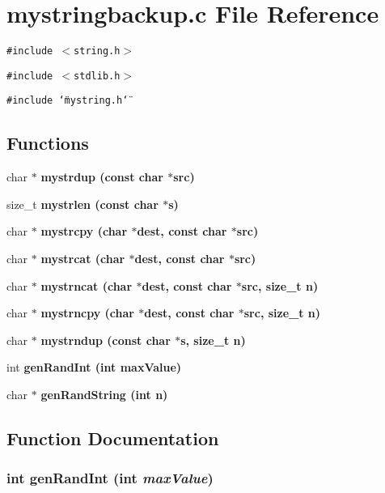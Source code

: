 \section{mystringbackup.c File Reference}
\label{mystringbackup_8c}
{\tt \#include $<$string.h$>$}\par
{\tt \#include $<$stdlib.h$>$}\par
{\tt \#include \char`\"{}mystring.h\char`\"{}}\par
\subsection*{Functions}
\begin{CompactItemize}
\item 
char $\ast$ \bf{mystrdup} (const char $\ast$src)
\item 
size\_\-t \bf{mystrlen} (const char $\ast$s)
\item 
char $\ast$ \bf{mystrcpy} (char $\ast$dest, const char $\ast$src)
\item 
char $\ast$ \bf{mystrcat} (char $\ast$dest, const char $\ast$src)
\item 
char $\ast$ \bf{mystrncat} (char $\ast$dest, const char $\ast$src, size\_\-t n)
\item 
char $\ast$ \bf{mystrncpy} (char $\ast$dest, const char $\ast$src, size\_\-t n)
\item 
char $\ast$ \bf{mystrndup} (const char $\ast$s, size\_\-t n)
\item 
int \bf{gen\-Rand\-Int} (int max\-Value)
\item 
char $\ast$ \bf{gen\-Rand\-String} (int n)
\end{CompactItemize}


\subsection{Function Documentation}
\subsubsection{\setlength{\rightskip}{0pt plus 5cm}int gen\-Rand\-Int (int {\em max\-Value})}\label{mystringbackup_8c_c4418fa1a8e694adecb1016209595ae1}



